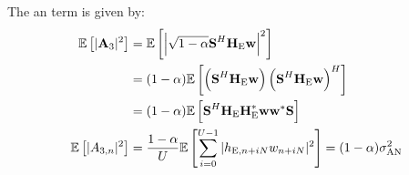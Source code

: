 The \gls{an} term is given by:
\begin{subequations}
    \begin{align}
        \mathbb{E} \left[|\textbf{A}_{3}|^2\right] &=  \mathbb{E} \left[\left|\sqrt{1-\alpha}\textbf{S}^H \textbf{H}_{\text{E}} \textbf{w}\right|^2\right] \\
        &= (1-\alpha)\mathbb{E} \left[\left(\textbf{S}^H \textbf{H}_{\text{E}} \textbf{w} \right)\left(\textbf{S}^H \textbf{H}_{\text{E}}\textbf{w} \right)^H\right] \\
        &=(1-\alpha)\mathbb{E} \left[\textbf{S}^H \textbf{H}_{\text{E}}\textbf{H}^*_{\text{E}} \textbf{w}\textbf{w}^* \textbf{S} \right] \\
        \mathbb{E} \left[|A_{3,n}|^2\right]  &= \frac{1-\alpha}{U} \mathbb{E} \left[\sum_{i=0}^{U-1} |h_{\text{E}, n + iN}w_{n + iN}|^2\right] = (1-\alpha)\sigma^2_{\text{AN}}
    \end{align}
    \label{eq:appA:an_eve_filt0}
\end{subequations}



